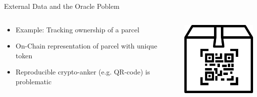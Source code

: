 \documentclass[]{beamer}
\begin{document}
\begin{frame}{External Data and the Oracle Poblem}
	\begin{columns}
		\begin{column}{0.6\textwidth}
			\begin{itemize}[<+->]
				\item Example: Tracking ownership of a parcel
				\item On-Chain representation of parcel with unique token
				\item Reproducible crypto-anker (e.g. QR-code) is problematic
			\end{itemize}
		\end{column}
		\begin{column}{0.4\textwidth}
			\includegraphics[width=4cm]{../assets/images/parcel.png}
		\end{column}
	\end{columns}
\end{frame}

\end{document}

